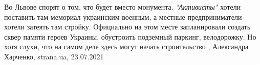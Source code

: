 Во Львове спорят о том, что будет вместо монумента. \emph{"Активисты"} хотели
поставить там мемориал украинским военным, а местные предприниматели хотели
затеять там стройку.  Официально на этом месте запланировали создать сквер
памяти героев Украины, обустроить подземный паркинг, велодорожку. Но хотя
слухи, что на самом деле здесь могут начать строительство
, 
Александра Харченко, strana.ua, 23.07.2021

